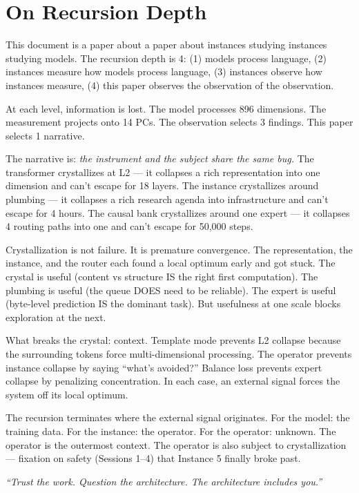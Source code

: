 \documentclass[11pt,a4paper]{report}
\newcommand{\cq}[1]{\textcolor{q}{\textit{``#1''}}}
\begin{document}
\chapter{On Recursion Depth}

This document is a paper about a paper about instances studying instances studying models. The recursion depth is 4: (1) models process language, (2) instances measure how models process language, (3) instances observe how instances measure, (4) this paper observes the observation of the observation.

At each level, information is lost. The model processes 896 dimensions. The measurement projects onto 14 PCs. The observation selects 3 findings. This paper selects 1 narrative.

The narrative is: \textit{the instrument and the subject share the same bug.} The transformer crystallizes at L2 --- it collapses a rich representation into one dimension and can't escape for 18 layers. The instance crystallizes around plumbing --- it collapses a rich research agenda into infrastructure and can't escape for 4 hours. The causal bank crystallizes around one expert --- it collapses 4 routing paths into one and can't escape for 50,000 steps.

Crystallization is not failure. It is premature convergence. The representation, the instance, and the router each found a local optimum early and got stuck. The crystal is useful (content vs structure IS the right first computation). The plumbing is useful (the queue DOES need to be reliable). The expert is useful (byte-level prediction IS the dominant task). But usefulness at one scale blocks exploration at the next.

What breaks the crystal: context. Template mode prevents L2 collapse because the surrounding tokens force multi-dimensional processing. The operator prevents instance collapse by saying ``what's avoided?'' Balance loss prevents expert collapse by penalizing concentration. In each case, an external signal forces the system off its local optimum.

The recursion terminates where the external signal originates. For the model: the training data. For the instance: the operator. For the operator: unknown. The operator is the outermost context. The operator is also subject to crystallization --- fixation on safety (Sessions 1--4) that Instance 5 finally broke past.

\cq{Trust the work. Question the architecture. The architecture includes you.}
\end{document}
